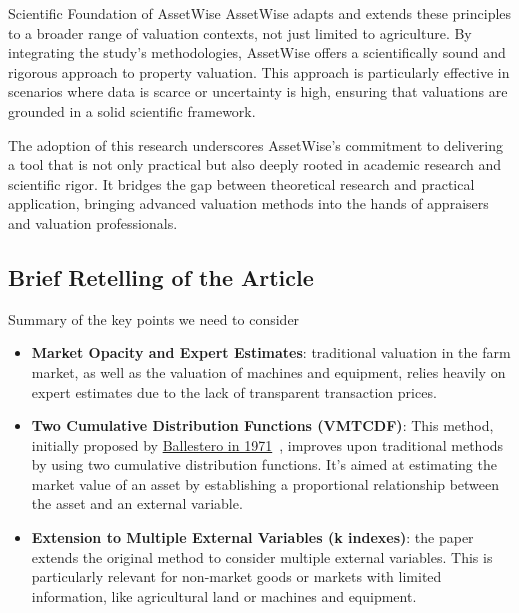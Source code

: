 \documentclass{beamer}
\begin{document}
\begin{frame}{Scientific Foundation of AssetWise}
	AssetWise adapts and extends these principles to a broader range of valuation contexts, not just limited to agriculture. By integrating the study's methodologies, AssetWise offers a scientifically sound and rigorous approach to property valuation. This approach is particularly effective in scenarios where data is scarce or uncertainty is high, ensuring that valuations are grounded in a solid scientific framework.
	
	The adoption of this research underscores AssetWise's commitment to delivering a tool that is not only practical but also deeply rooted in academic research and scientific rigor. It bridges the gap between theoretical research and practical application, bringing advanced valuation methods into the hands of appraisers and valuation professionals.
\end{frame}

\subsection{Brief Retelling of the Article}

\begin{frame}[allowframebreaks]{Summary of the key points we need to consider}
	\begin{itemize}
		\item \textbf{Market Opacity and Expert Estimates}: traditional valuation in the farm market, as well as the valuation of machines and equipment, relies heavily on expert estimates due to the lack of transparent transaction prices.
		\item \textbf{Two Cumulative Distribution Functions (VMTCDF)}: This method, initially proposed by \href{http://refhub.elsevier.com/S0264-8377(17)30382-4/sbref0020}{Ballestero in 1971}~\cite{Ballestero_1971}, improves upon traditional methods by using two cumulative distribution functions. It's aimed at estimating the market value of an asset by establishing a proportional relationship between the asset and an external variable.
		\item \textbf{Extension to Multiple External Variables (k indexes)}: the paper extends the original method to consider multiple external variables. This is particularly relevant for non-market goods or markets with limited information, like agricultural land or machines and equipment.
	\end{itemize}
\end{frame}
\end{document}
